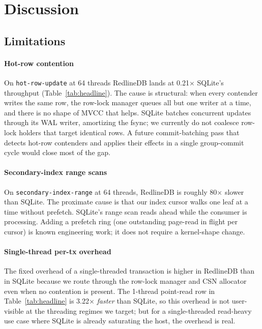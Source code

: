 \section{Discussion}\label{sec:discussion}

\subsection{Limitations}
\paragraph{Hot-row contention} On \texttt{hot-row-update} at 64
threads RedlineDB lands at 0.21$\times$ SQLite's throughput
(Table~\ref{tab:headline}). The cause is structural: when every
contender writes the same row, the row-lock manager queues all but
one writer at a time, and there is no shape of MVCC that helps. SQLite
batches concurrent updates through its WAL writer, amortizing the
fsync; we currently do not coalesce row-lock holders that target
identical rows. A future commit-batching pass that detects
hot-row contenders and applies their effects in a single
group-commit cycle would close most of the gap.

\paragraph{Secondary-index range scans} On
\texttt{secondary-index-range} at 64 threads, RedlineDB is roughly
80$\times$ slower than SQLite. The proximate cause is that our
index cursor walks one leaf at a time without prefetch. SQLite's
range scan reads ahead while the consumer is processing. Adding a
prefetch ring (one outstanding page-read in flight per cursor) is
known engineering work; it does not require a kernel-shape change.

\paragraph{Single-thread per-tx overhead} The fixed overhead of a
single-threaded transaction is higher in RedlineDB than in SQLite
because we route through the row-lock manager and CSN allocator
even when no contention is present. The 1-thread point-read row in
Table~\ref{tab:headline} is 3.22$\times$ \emph{faster} than SQLite,
so this overhead is not user-visible at the threading regimes we
target; but for a single-threaded read-heavy use case where SQLite
is already saturating the host, the overhead is real.

